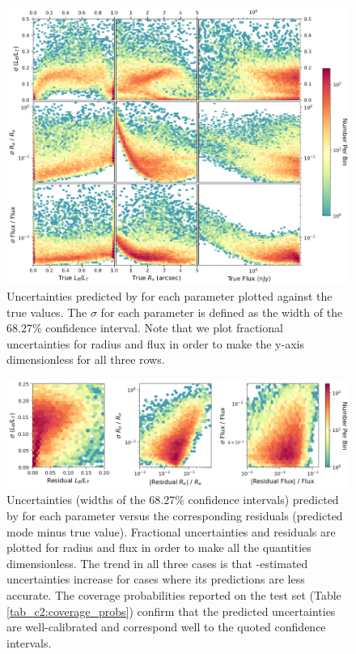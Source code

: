 \begin{figure}[htb]
	\centering
	\includegraphics[width
	=\textwidth]{2d_uncertainty_norm.png}
	\caption{Uncertainties predicted by \gampen{} for each parameter plotted against the true values. The $\sigma$ for each parameter is defined as the width of the $68.27\%$ confidence interval. %
	Note that we plot fractional uncertainties for radius and flux in order to make the y-axis dimensionless for all three rows.}
	\label{fig_c2:2d_uncertainty_hists_norm}
\end{figure}

\begin{figure}[htb]
	\centering
	\includegraphics[width
	=\textwidth]{uncer_resi.png}
	\caption{Uncertainties (widths of the $68.27\%$ confidence intervals)  predicted by \gampen{} for each parameter  versus the corresponding residuals (predicted mode minus true value). Fractional uncertainties and residuals are plotted for radius and flux in order to make all the quantities dimensionless. The trend in all three cases is that \gampen{}-estimated uncertainties increase for cases where its predictions are less accurate. The coverage probabilities reported on the test set (Table \ref{tab_c2:coverage_probs}) confirm that the predicted uncertainties are well-calibrated and correspond well to the quoted confidence intervals.}
	\label{fig_c2:uncer_resi}
\end{figure}

